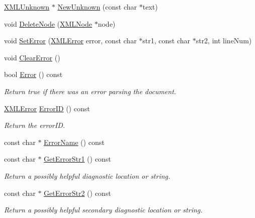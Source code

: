 \begin{DoxyCompactItemize}
\item 
\hyperlink{classtinyxml2_1_1_x_m_l_unknown}{X\+M\+L\+Unknown} $\ast$ \hyperlink{classtinyxml2_1_1_x_m_l_document_a4954f502c5fd7f49de54c3c0c99bb73d}{New\+Unknown} (const char $\ast$text)
\item 
void \hyperlink{classtinyxml2_1_1_x_m_l_document_ac1d6e2c7fcc1a660624ac4f68e96380d}{Delete\+Node} (\hyperlink{classtinyxml2_1_1_x_m_l_node}{X\+M\+L\+Node} $\ast$node)
\item 
void \hyperlink{classtinyxml2_1_1_x_m_l_document_ab6a90fefdba2b3bb275fc06b72c7c2e6}{Set\+Error} (\hyperlink{namespacetinyxml2_a1fbf88509c3ac88c09117b1947414e08}{X\+M\+L\+Error} error, const char $\ast$str1, const char $\ast$str2, int line\+Num)
\item 
void \hyperlink{classtinyxml2_1_1_x_m_l_document_a4085d9c52f1d93214311459d6d1fcf17}{Clear\+Error} ()
\item 
bool \hyperlink{classtinyxml2_1_1_x_m_l_document_a34e6318e182e40e3cc4f4ba5d59ed9ed}{Error} () const
\begin{DoxyCompactList}\small\item\em Return true if there was an error parsing the document. \end{DoxyCompactList}\item 
\hyperlink{namespacetinyxml2_a1fbf88509c3ac88c09117b1947414e08}{X\+M\+L\+Error} \hyperlink{classtinyxml2_1_1_x_m_l_document_afa3ed33b3107f920ec2b301f805ac17d}{Error\+ID} () const
\begin{DoxyCompactList}\small\item\em Return the error\+ID. \end{DoxyCompactList}\item 
const char $\ast$ \hyperlink{classtinyxml2_1_1_x_m_l_document_a1a5f2b63427caffd4cde15781d9d11f9}{Error\+Name} () const
\item 
const char $\ast$ \hyperlink{classtinyxml2_1_1_x_m_l_document_a229494e30e5473237f3fa547eee4c43f}{Get\+Error\+Str1} () const
\begin{DoxyCompactList}\small\item\em Return a possibly helpful diagnostic location or string. \end{DoxyCompactList}\item 
const char $\ast$ \hyperlink{classtinyxml2_1_1_x_m_l_document_a2d952f49c761bffd2903250680a8716b}{Get\+Error\+Str2} () const
\begin{DoxyCompactList}\small\item\em Return a possibly helpful secondary diagnostic location or string. \end{DoxyCompactList}\item 

\end{DoxyCompactItemize}
